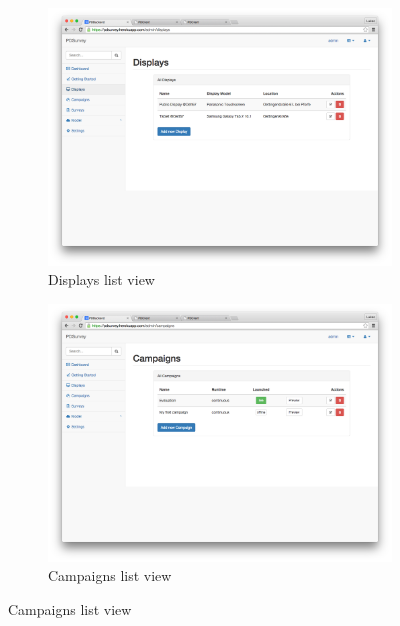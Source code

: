     \begin{figure}[h]
        \centering
        \begin{subfigure}{0.55\textwidth}
            \centering
            \includegraphics[width=\columnwidth]{img/screenshots/pdadmin/displays.png}
            \caption{Displays list view}
            \label{screenshot:pdadmin-displays}
        \end{subfigure}
        \hfill
        \begin{subfigure}{0.55\textwidth}
            \centering
            \includegraphics[width=\columnwidth]{img/screenshots/pdadmin/campaigns.png}
            \caption{Campaigns list view}
            \label{screenshot:pdadmin-campaigns}
        \end{subfigure}

\end{figure}
